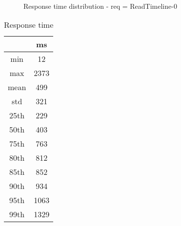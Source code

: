 \begin{minipage}{0.75\linewidth}
\begin{figure}[h]
\begin{adjustbox}{max width=1.0\linewidth, keepaspectratio}
  \end{adjustbox}
  \caption{Response time distribution - req = ReadTimeline-0}
\end{figure}
\end{minipage}\hfill\begin{minipage}{0.18\linewidth}
\begin{table}[h]
\begin{tabular}{|cc|}
\hline
\textbf{} & \textbf{ms}\\ \hline
 \Xhline{0.005\arrayrulewidth}
min & 12\\
 \Xhline{0.005\arrayrulewidth}
max & 2373\\
 \Xhline{0.005\arrayrulewidth}
mean & 499\\
 \Xhline{0.005\arrayrulewidth}
std & 321\\
\hline
\hline
 \Xhline{0.005\arrayrulewidth}
25th & 229\\
 \Xhline{0.005\arrayrulewidth}
50th & 403\\
 \Xhline{0.005\arrayrulewidth}
75th & 763\\
 \Xhline{0.005\arrayrulewidth}
80th & 812\\
 \Xhline{0.005\arrayrulewidth}
85th & 852\\
 \Xhline{0.005\arrayrulewidth}
90th & 934\\
 \Xhline{0.005\arrayrulewidth}
95th & 1063\\
 \Xhline{0.005\arrayrulewidth}
99th & 1329\\
\hline
\end{tabular}
\caption{Response time}
\end{table}
\end{minipage}\hfill